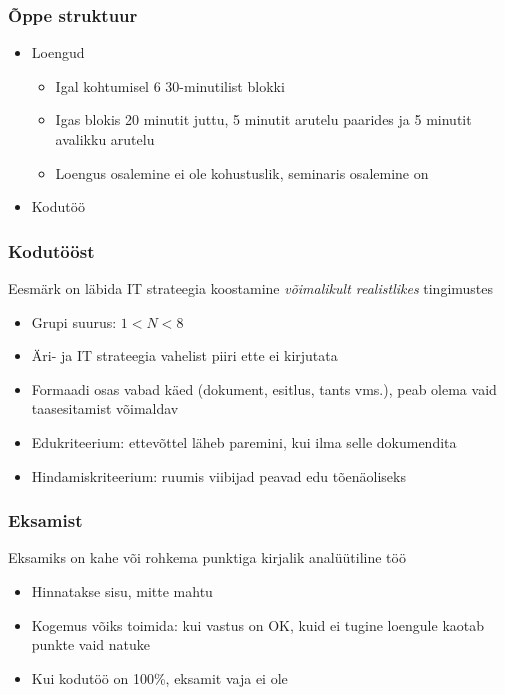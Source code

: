 \begin{frame}[fragile]
  \frametitle{Õppe struktuur}
	\begin{itemize}
	\item Loengud
	\begin{itemize}
		\item Igal kohtumisel 6 30-minutilist blokki
		\item Igas blokis 20 minutit juttu, 5 minutit arutelu paarides ja 5 minutit avalikku arutelu
		\item Loengus osalemine ei ole kohustuslik, seminaris osalemine on
	\end{itemize}
	\item Kodutöö
	\end{itemize}
\end{frame}

\begin{frame}[fragile]
  \frametitle{Kodutööst}
Eesmärk on läbida IT strateegia koostamine \emph{võimalikult realistlikes} tingimustes 
  	\begin{itemize}
		\item Grupi suurus: $1<N<8$
		\item Äri- ja IT strateegia vahelist piiri ette ei kirjutata
		\item Formaadi osas vabad käed (dokument, esitlus, tants vms.), peab olema vaid taasesitamist võimaldav
		\item Edukriteerium: ettevõttel läheb paremini, kui ilma selle dokumendita
		\item Hindamiskriteerium: ruumis viibijad peavad edu tõenäoliseks
	\end{itemize}
\end{frame}

\begin{frame}[fragile]
  \frametitle{Eksamist}
  Eksamiks on kahe või rohkema punktiga kirjalik analüütiline töö
  	\begin{itemize}
		\item Hinnatakse sisu, mitte mahtu
		\item Kogemus võiks toimida: kui vastus on OK, kuid ei tugine loengule kaotab punkte vaid natuke
		\item Kui kodutöö on 100\%, eksamit vaja ei ole
	\end{itemize}
\end{frame}


